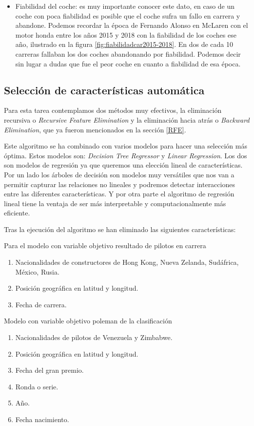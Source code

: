 \begin{itemize}
    \item Fiabilidad del coche: es muy importante conocer este dato, en caso de un coche con poca fiabilidad es posible que el coche sufra un fallo en carrera y abandone. Podemos recordar la época de Fernando Alonso en McLaren con el motor honda entre los años 2015 y 2018 con la fiabilidad de los coches ese año, ilustrado en la figura \ref{fig:fiabilidadcar2015-2018}. En dos de cada 10 carreras fallaban los dos coches abandonando por fiabilidad. Podemos decir sin lugar a dudas que fue el peor coche en cuanto a fiabilidad de esa época.
\end{itemize} 

\subsection{Selección de características automática}

Para esta tarea contemplamos dos métodos muy efectivos, la eliminación recursiva o \textit{Recursive Feature Elimination} y la eliminación hacia atrás o \textit{Backward Elimination}, que ya fueron mencionados en la sección \ref{RFE}.

Este algoritmo se ha combinado con varios modelos para hacer una selección más óptima. Estos modelos son: \textit{Decision Tree Regressor} y \textit{Linear Regression}. Los dos son modelos de regresión ya que queremos una elección lineal de características. Por un lado los árboles de decisión son modelos muy versátiles que nos van a permitir capturar las relaciones no lineales y podremos detectar interacciones entre las diferentes características. Y por otra parte el algoritmo de regresión lineal tiene la ventaja de ser más interpretable y computacionalmente más eficiente.

Tras la ejecución del algoritmo se han eliminado las siguientes características:

Para el modelo con variable objetivo resultado de pilotos en carrera
\begin{enumerate}
    \item Nacionalidades de constructores de Hong Kong, Nueva Zelanda, Sudáfrica, México, Rusia.
    \item Posición geográfica en latitud y longitud.
    \item Fecha de carrera.
\end{enumerate}

Modelo con variable objetivo poleman de la clasificación
 \begin{enumerate}
    \item Nacionalidades de pilotos de Venezuela y Zimbabwe.
    \item Posición geográfica en latitud y longitud.
    \item Fecha del gran premio.
    \item Ronda o serie.
    \item Año.
    \item Fecha nacimiento.
\end{enumerate}

